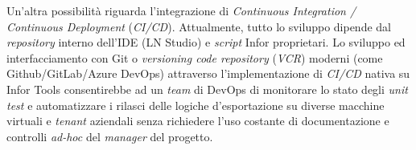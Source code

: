 Un'altra possibilità riguarda l'integrazione di \textit{Continuous Integration / Continuous Deployment} (\textit{CI/CD}). 
Attualmente, tutto lo sviluppo dipende dal \textit{repository} interno dell'IDE (LN Studio) e \textit{script} Infor proprietari. Lo sviluppo ed interfacciamento con 
Git o \textit{versioning code repository} (\textit{VCR}) moderni (come Github/GitLab/Azure DevOps) attraverso l'implementazione di \textit{CI/CD} nativa su Infor Tools consentirebbe ad un 
\textit{team} di DevOps di monitorare lo stato degli \textit{unit test} e automatizzare i rilasci delle logiche d'esportazione su diverse macchine virtuali e \textit{tenant} 
aziendali senza richiedere l'uso costante di documentazione e controlli \textit{ad-hoc} del \textit{manager} del progetto.

